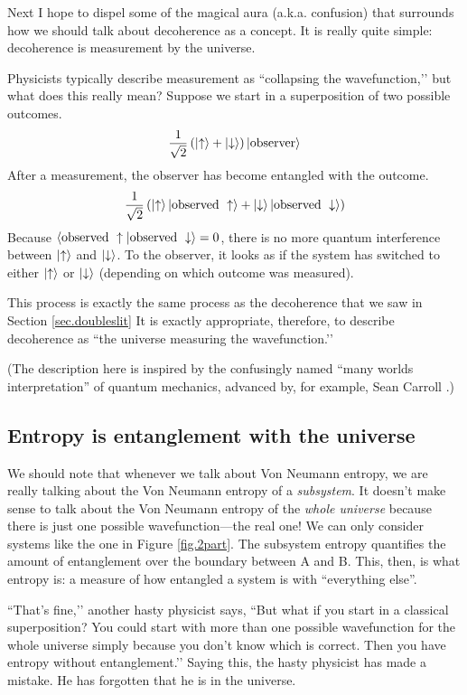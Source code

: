 Next I hope to dispel some of the magical aura (a.k.a. confusion) that surrounds how we should talk about decoherence as a concept. It is really quite simple: decoherence is measurement by the universe.

Physicists typically describe measurement as ``collapsing the wavefunction,’’ but what does this really mean? Suppose we start in a superposition of two possible outcomes.
\[
\frac{1}{\sqrt{2}}\left(\left|\uparrow\right\rangle + \left|\downarrow\right\rangle\right)\left|\text{observer}\right\rangle
\]
After a measurement, the observer has become entangled with the outcome.
\[
\frac{1}{\sqrt{2}}\left(\left|\uparrow\right\rangle\left|\text{observed }\uparrow\right\rangle + \left|\downarrow\right\rangle\left|\text{observed }\downarrow\right\rangle\right)
\]
Because \(\left\langle\text{observed }\uparrow|\text{observed }\downarrow\right\rangle=0\), there is no more quantum interference between \(\left|\uparrow\right\rangle\) and \(\left|\downarrow\right\rangle\). To the observer, it looks as if the system has switched to either \(\left|\uparrow\right\rangle\) or \(\left|\downarrow\right\rangle\) (depending on which outcome was measured).

This process is exactly the same process as the decoherence that we saw in Section \ref{sec.doubleslit} It is exactly appropriate, therefore, to describe decoherence as ``the universe measuring the wavefunction.’’

(The description here is inspired by the confusingly named ``many worlds interpretation'' of quantum mechanics, advanced by, for example, Sean Carroll \cite{Carroll}.)

\subsection{Entropy is entanglement with the universe}

We should note that whenever we talk about Von Neumann entropy, we are really talking about the Von Neumann entropy of a \emph{subsystem}. It doesn’t make sense to talk about the Von Neumann entropy of the \emph{whole universe} because there is just one possible wavefunction—the real one! We can only consider systems like the one in Figure \ref{fig.2part}. The subsystem entropy quantifies the amount of entanglement over the boundary between A and B. This, then, is what entropy is: a measure of how entangled a system is with ``everything else''.

``That’s fine,’’ another hasty physicist says, ``But what if you start in a classical superposition? You could start with more than one possible wavefunction for the whole universe simply because you don’t know which is correct. Then you have entropy without entanglement.’’ Saying this, the hasty physicist has made a mistake. He has forgotten that he is in the universe.

